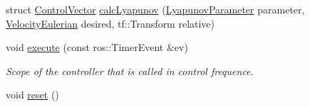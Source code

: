 \begin{DoxyCompactItemize}
struct \hyperlink{structController_1_1ControlVector}{Control\+Vector} \hyperlink{classController_a5342dd66c1228e651e569d9b1c31d82e}{calc\+Lyapunov} (\hyperlink{structController_1_1LyapunovParameter}{Lyapunov\+Parameter} parameter, \hyperlink{classController_a6849bee332c04d67ac6f3052cccd2669}{Velocity\+Eulerian} desired, tf\+::\+Transform relative)
\item 
void \hyperlink{classController_abe0a6e0155a0b159efe425e635d3ae76}{execute} (const ros\+::\+Timer\+Event \&ev)\hypertarget{classController_abe0a6e0155a0b159efe425e635d3ae76}{}\label{classController_abe0a6e0155a0b159efe425e635d3ae76}

\begin{DoxyCompactList}\small\item\em Scope of the controller that is called in control frequence. \end{DoxyCompactList}\item 
void \hyperlink{classController_ab5515748f1b0c82f015e039c817ee5f7}{reset} ()\hypertarget{classController_ab5515748f1b0c82f015e039c817ee5f7}{}\label{classController_ab5515748f1b0c82f015e039c817ee5f7}


\end{DoxyCompactItemize}
